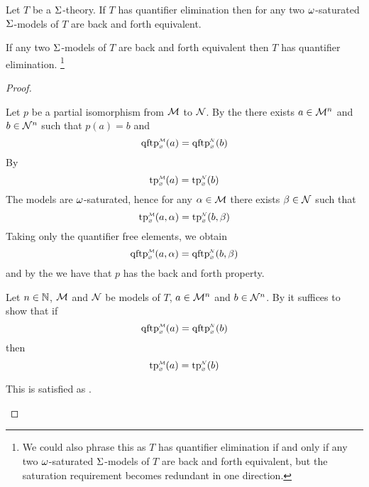 \begin{prop}
    Let $T$ be a $\Sigma$-theory.
    If $T$ has quantifier elimination then
    for any two $\omega$-saturated $\Sigma$-models of $T$
    are back and forth equivalent.

    If any two $\Sigma$-models of $T$
    are back and forth equivalent then $T$ has quantifier 
    elimination.
    \footnote{We could also phrase this as $T$ has 
    quantifier elimination if and only if
    any two $\omega$-saturated $\Sigma$-models of $T$
    are back and forth equivalent, but the saturation requirement becomes 
    redundant in one direction.}
\end{prop}
\begin{proof}
    \begin{forward}
        Let $p$ be a partial isomorphism from $\mathcal{M}$ to $\mathcal{N}$.
        By the 
        there exists $a \in \mathcal{M}^n$ and $b \in \mathcal{N}^n$ such that 
        $p(a) = b$ and 
        \[\subintp{\nothing}{\MM}{\qftp}(a) = 
        \subintp{\nothing}{\NN}{\qftp}(b)\]
        By 
        \[\subintp{\nothing}{\MM}{\tp}(a) = 
        \subintp{\nothing}{\NN}{\tp}(b)\]
        The models are $\omega$-saturated, hence  
        for any $\alpha \in \mathcal{M}$ there exists $\beta \in \mathcal{N}$ such that 
        \[\subintp{\nothing}{\MM}{\tp}(a,\al) = 
        \subintp{\nothing}{\NN}{\tp}(b,\be)\]
        Taking only the quantifier free elements,
        we obtain 
        \[\subintp{\nothing}{\MM}{\qftp}(a,\al) = 
        \subintp{\nothing}{\NN}{\qftp}(b,\be)\]
        and by the
        we have that $p$ has the back and forth property.
    \end{forward}

    \begin{backward}
        Let $n \in \mathbb{N}$, $\mathcal{M}$ and $\mathcal{N}$ be models of $T$,
        $a \in \mathcal{M}^n$ and $b \in \mathcal{N}^n$.
        By  it suffices to show that 
        if \[\subintp{\nothing}{\MM}{\qftp}(a) = 
        \subintp{\nothing}{\NN}{\qftp}(b)\]
        then \[\subintp{\nothing}{\MM}{\tp}(a) = 
        \subintp{\nothing}{\NN}{\tp}(b)\]

        This is satisfied as
        .
    \end{backward}
\end{proof}

